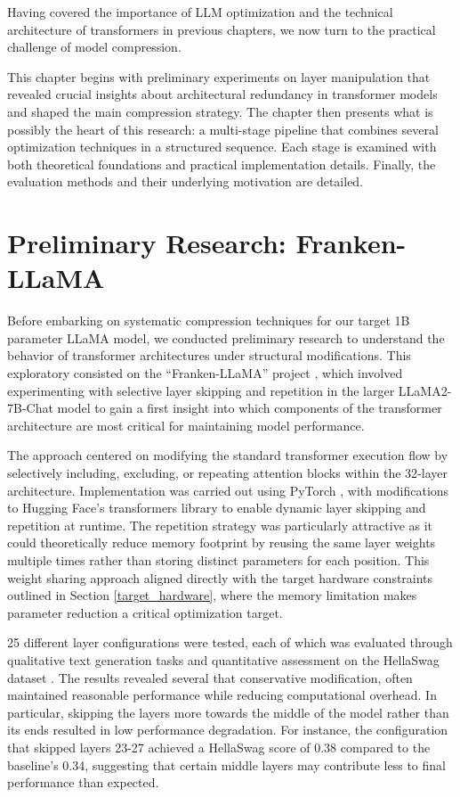 Having covered the importance of LLM optimization and the technical architecture of transformers in previous chapters, we now turn to the practical challenge of model compression.

This chapter begins with preliminary experiments on layer manipulation that revealed crucial insights about architectural redundancy in transformer models and shaped the main compression strategy. The chapter then presents what is possibly the heart of this research: a multi-stage pipeline that combines several optimization techniques in a structured sequence. Each stage is examined with both theoretical foundations and practical implementation details. Finally, the evaluation methods and their underlying motivation are detailed.

\section{Preliminary Research: Franken-LLaMA} \label{frankenllama}

Before embarking on systematic compression techniques for our target 1B parameter LLaMA model, we conducted preliminary research to understand the behavior of transformer architectures under structural modifications. This exploratory consisted on the ``Franken-LLaMA'' project \cite{franken-llama}, which involved experimenting with selective layer skipping and repetition in the larger LLaMA2-7B-Chat \cite{llama2} model to gain a first insight into which components of the transformer architecture are most critical for maintaining model performance.

The approach centered on modifying the standard transformer execution flow by selectively including, excluding, or repeating attention blocks within the 32-layer architecture. Implementation was carried out using PyTorch \cite{pytorch}, with modifications to Hugging Face's transformers library \cite{hf_transformers} to enable dynamic layer skipping and repetition at runtime. The repetition strategy was particularly attractive as it could theoretically reduce memory footprint by reusing the same layer weights multiple times rather than storing distinct parameters for each position. This weight sharing approach aligned directly with the target hardware constraints outlined in Section \ref{target_hardware}, where the memory limitation makes parameter reduction a critical optimization target.

25 different layer configurations were tested, each of which was evaluated through qualitative text generation tasks and quantitative assessment on the HellaSwag dataset \cite{hellaswag}.
The results revealed several that conservative modification, often maintained reasonable performance while reducing computational overhead. In particular, skipping the layers more towards the middle of the model rather than its ends resulted in low performance degradation. For instance, the configuration that skipped layers 23-27 achieved a HellaSwag score of 0.38 compared to the baseline's 0.34, suggesting that certain middle layers may contribute less to final performance than expected.

